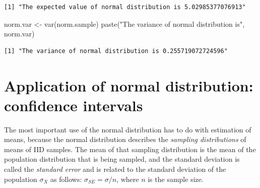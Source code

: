 \documentclass[
  letterpaper,
  DIV=11,
  numbers=noendperiod]{scrreprt}
\newenvironment{Shaded}{\begin{snugshade}}{\end{snugshade}}
\newcommand{\FunctionTok}[1]{\textcolor[rgb]{0.28,0.35,0.67}{#1}}
\newcommand{\NormalTok}[1]{\textcolor[rgb]{0.00,0.23,0.31}{#1}}
\newcommand{\OtherTok}[1]{\textcolor[rgb]{0.00,0.23,0.31}{#1}}
\newcommand{\StringTok}[1]{\textcolor[rgb]{0.13,0.47,0.30}{#1}}
\begin{document}
\begin{verbatim}
[1] "The expected value of normal distribution is 5.02985377076913"
\end{verbatim}

\begin{Shaded}
\begin{Highlighting}[]
\NormalTok{norm.var }\OtherTok{\textless{}{-}} \FunctionTok{var}\NormalTok{(norm.sample)}
\FunctionTok{paste}\NormalTok{(}\StringTok{"The variance of normal distribution is"}\NormalTok{, norm.var)}
\end{Highlighting}
\end{Shaded}

\begin{verbatim}
[1] "The variance of normal distribution is 0.255719072724596"
\end{verbatim}

\hypertarget{application-of-normal-distribution-confidence-intervals}{%
\section{Application of normal distribution: confidence
intervals}\label{application-of-normal-distribution-confidence-intervals}}

The most important use of the normal distribution has to do with
estimation of means, because the normal distribution describes the
\emph{sampling distributions} of means of IID samples. The mean of that
sampling distribution is the mean of the population distribution that is
being sampled, and the standard deviation is called the \emph{standard
error} and is related to the standard deviation of the population
\(\sigma_X\) as follows: \(\sigma_{SE} = \sigma/n\), where \(n\) is the
sample size.
\end{document}
